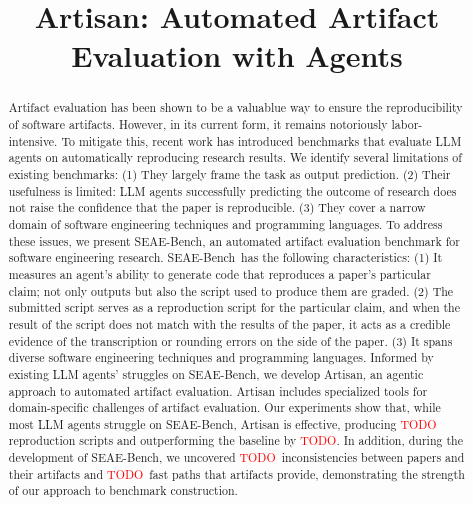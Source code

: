 \documentclass[acmsmall,screen,review,anonymous]{acmart}
\begin{document}
\newcommand\benchmark{SEAE-Bench}
\newcommand\approach{Artisan}

\newcommand\goodscript{particular reproduction script}
\newcommand\newbug{paper-artifact inconsistencies}
\newcommand\fastpath{fast-path}

\newcommand\papersetsize{30}
\newcommand\tasksetsize{162}

\newcommand\todo[1]{\textcolor{red}{TODO: #1}}
\newcommand\artisanpartial{\textcolor{red}{TODO}}
\newcommand\artisanpartialoutperform{\textcolor{red}{TODO}}
\newcommand\inconsistenciessize{\textcolor{red}{TODO}}
\newcommand\fastpathsize{\textcolor{red}{TODO}}

\title{Artisan: Automated Artifact Evaluation with Agents}
\begin{abstract}
Artifact evaluation has been shown to be a valuablue way to ensure the reproducibility of software artifacts.
However, in its current form, it remains notoriously labor-intensive.
To mitigate this, recent work has introduced benchmarks that evaluate LLM agents on automatically reproducing research results.
We identify several limitations of existing benchmarks:
(1) They largely frame the task as output prediction.
(2) Their usefulness is limited: LLM agents successfully predicting the outcome of research does not raise the confidence that the paper is reproducible.
(3) They cover a narrow domain of software engineering techniques and programming languages.
To address these issues, we present \benchmark, an automated artifact evaluation benchmark for software engineering research.
\benchmark~has the following characteristics:
(1) It measures an agent’s ability to generate code that reproduces a paper’s particular claim; not only outputs but also the script used to produce them are graded.
(2) The submitted script serves as a reproduction script for the particular claim, and when the result of the script does not match with the results of the paper, it acts as a credible evidence of the transcription or rounding errors on the side of the paper.
(3) It spans diverse software engineering techniques and programming languages.
Informed by existing LLM agents’ struggles on \benchmark, we develop Artisan, an agentic approach to automated artifact evaluation.
Artisan includes specialized tools for domain-specific challenges of artifact evaluation.
Our experiments show that, while most LLM agents struggle on \benchmark, Artisan is effective, producing \artisanpartial{} reproduction scripts and outperforming the baseline by \artisanpartialoutperform{}.
In addition, during the development of \benchmark, we uncovered \inconsistenciessize~inconsistencies between papers and their artifacts and \fastpathsize~fast paths that artifacts provide, demonstrating the strength of our approach to benchmark construction.
\end{abstract}
\maketitle










\end{document}
